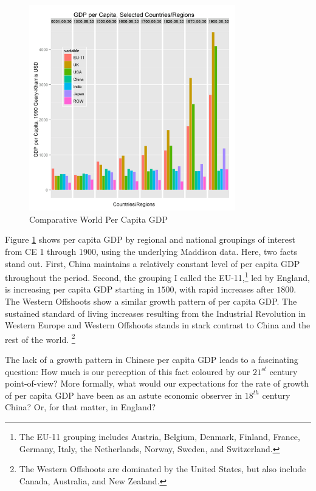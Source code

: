 \documentclass[12pt]{article}
\numberwithin{equation}{section}
\begin{document}
		\begin{figure}[htb]
		\centering
		\includegraphics[width=0.8\textwidth]{ggdpcapitadodge.png}
		\caption{Comparative World Per Capita GDP}
		\label{fig:capita}
		\end{figure}
		
		Figure \ref{fig:capita} shows per capita GDP by regional and national groupings of interest from CE 1 through 1900, using the underlying Maddison data. Here, two facts stand out. First, China maintains a relatively constant level of per capita GDP throughout the period. Second, the grouping I called the EU-11,\footnote{The EU-11 grouping includes Austria, Belgium, Denmark, Finland, France, Germany, Italy, the Netherlands, Norway, Sweden, and Switzerland.} led by England, is increasing per capita GDP starting in $1500$, with rapid increases after $1800$. The Western Offshoots show a similar growth pattern of per capita GDP. The sustained standard of living increases resulting from the Industrial Revolution in Western Europe and Western Offshoots stands in stark contrast to China and the rest of the world. \footnote{The Western Offshoots are dominated by the United States, but also include Canada, Australia, and New Zealand.}
		
		The lack of a growth pattern in Chinese per capita GDP leads to a fascinating question: How much is our perception of this fact coloured by our $21^{st}$ century point-of-view? More formally, what would our expectations for the rate of growth of per capita GDP have been as an astute economic observer in $18^{th}$ century China? Or, for that matter, in England?
		
\end{document}

